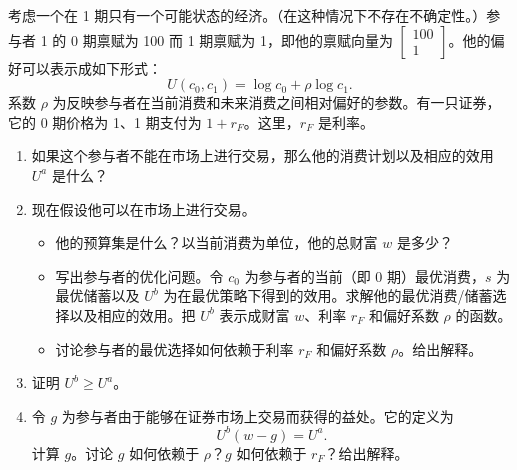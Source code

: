 \begin{problem}
 考虑一个在 1 期只有一个可能状态的经济。（在这种情况下不存在不确定性。）参与者 1 的 0 期禀赋为 100 而 1 期禀赋为 1，即他的禀赋向量为 $\begin{bmatrix}100 \\ 1\end{bmatrix}$。他的偏好可以表示成如下形式：
\[
    U(c_{0},c_{1})=\log c_{0}+\rho\log c_{1}.
\]
系数 $\rho$ 为反映参与者在当前消费和未来消费之间相对偏好的参数。有一只证券，它的 0 期价格为 1、1 期支付为 $1+r_{F}$。这里，$r_{F}$ 是利率。
\begin{enumerate}[label=(\alph*)]
    \item 如果这个参与者不能在市场上进行交易，那么他的消费计划以及相应的效用 $U^{a}$ 是什么？
    \item 现在假设他可以在市场上进行交易。
    \begin{itemize}
        \item 他的预算集是什么？以当前消费为单位，他的总财富 $w$ 是多少？
        \item 写出参与者的优化问题。令 $c_{0}$ 为参与者的当前（即 0 期）最优消费，$s$ 为最优储蓄以及 $U^{b}$ 为在最优策略下得到的效用。求解他的最优消费/储蓄选择以及相应的效用。把 $U^{b}$ 表示成财富 $w$、利率 $r_{F}$ 和偏好系数 $\rho$ 的函数。
        \item 讨论参与者的最优选择如何依赖于利率 $r_{F}$ 和偏好系数 $\rho$。给出解释。
    \end{itemize}
    \item 证明 $U^{b}\ge U^{a}$。
    \item 令 $g$ 为参与者由于能够在证券市场上交易而获得的益处。它的定义为
    \[
        U^{b}(w-g)=U^{a}.
    \]
    计算 $g$。讨论 $g$ 如何依赖于 $\rho$？$g$ 如何依赖于 $r_{F}$？给出解释。
\end{enumerate}
\end{problem}
